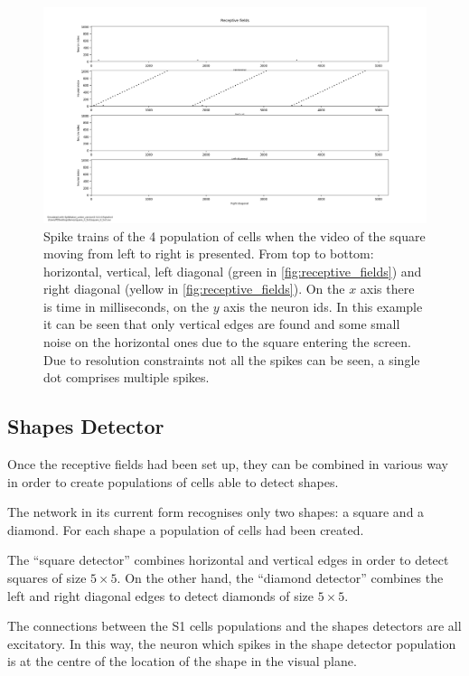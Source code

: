 \begin{figure}[ht]
\centering
\includegraphics[width=\textwidth]{images/development/receptive_fields_square_lr.png}
\caption[Receptive Fields Spike Trains of Square]{Spike trains of the 4 population of cells when the video of the square moving from left to right is presented. From top to bottom: horizontal, vertical, left diagonal (green in \cref{fig:receptive_fields}) and right diagonal (yellow in \cref{fig:receptive_fields}). On the $x$ axis there is time in milliseconds, on the $y$ axis the neuron ids. In this example it can be seen that only vertical edges are found and some small noise on the horizontal ones due to the square entering the screen. Due to resolution constraints not all the spikes can be seen, a single dot comprises multiple spikes.}
\label{fig:receptive_fields_square_lr}
\end{figure}

\subsection{Shapes Detector}
Once the receptive fields had been set up, they can be combined in various way in order to create populations of cells able to detect shapes.

The network in its current form recognises only two shapes: a square and a diamond. For each shape a population of cells had been created.

The ``square detector'' combines horizontal and vertical edges in order to detect squares of size $5 \times 5$. On the other hand, the ``diamond detector'' combines the left and right diagonal edges to detect diamonds of size $5 \times 5$. 

The connections between the \textsc{S1} cells populations and the shapes detectors are all excitatory. In this way, the neuron which spikes in the shape detector population is at the centre of the location of the shape in the visual plane. 

